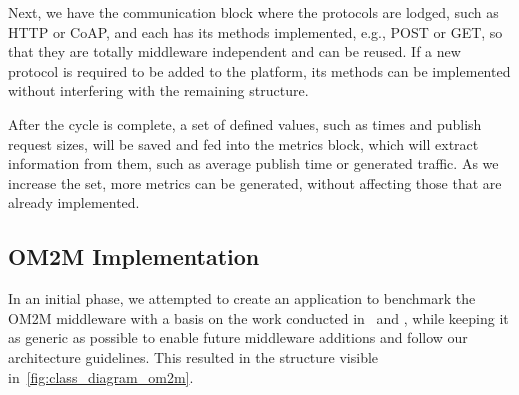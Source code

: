 \documentclass[conference]{IEEEtran}
\begin{document}
Next, we have the communication block where the protocols are lodged, such as HTTP or CoAP, and each has its methods implemented, e.g., POST or GET, so that they are totally middleware independent and can be reused. If a new protocol is required to be added to the platform, its methods can be implemented without interfering with the remaining structure.

After the cycle is complete, a set of defined values, such as times and publish request sizes, will be saved and fed into the metrics block, which will extract information from them, such as average publish time or generated traffic. As we increase the set, more metrics can be generated, without affecting those that are already implemented. 

\subsection{OM2M Implementation}

In an initial phase, we attempted to create an application to benchmark the OM2M middleware with a basis on the work conducted in~\cite{pereira_benchmarking_2018} and \cite{cardoso_benchmarking_2017}, while keeping it as generic as possible to enable future middleware additions and follow our architecture guidelines. This resulted in the structure visible in~\ref{fig:class_diagram_om2m}.
\end{document}
